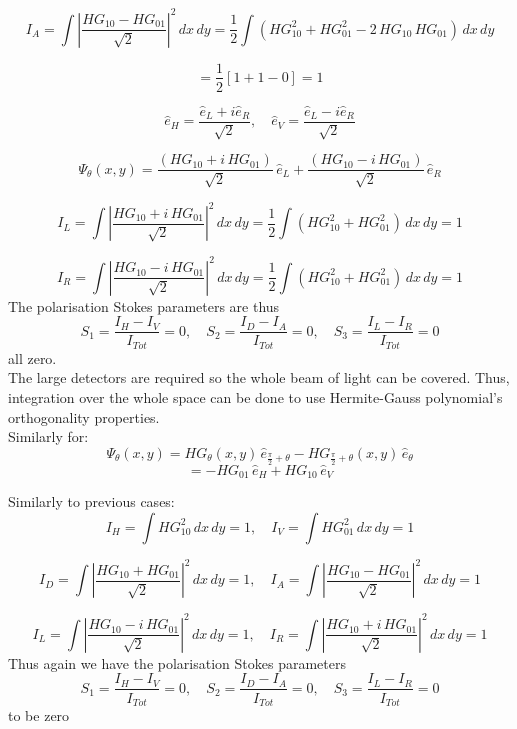 \documentclass{article}
\begin{document}
\[
I_A = \int \left| \frac{HG_{10} - HG_{01}}{\sqrt{2}} \right|^2 \, dx \, dy 
= \frac{1}{2} \int \left( HG_{10}^2 + HG_{01}^2 - 2 \, HG_{10} \, HG_{01} \right) \, dx \, dy
\]

\[
= \frac{1}{2} \left[ 1 + 1 - 0 \right] = 1
\]

\[
\hat{e}_H = \frac{\hat{e}_L + i \hat{e}_R}{\sqrt{2}}, \quad 
\hat{e}_V = \frac{\hat{e}_L - i \hat{e}_R}{\sqrt{2}}
\]

\[
\Psi_{\theta}(x, y) = \frac{(HG_{10} + i \, HG_{01})}{\sqrt{2}} \, \hat{e}_L 
+ \frac{(HG_{10} - i \, HG_{01})}{\sqrt{2}} \, \hat{e}_R
\]

\[
I_L = \int \left| \frac{HG_{10} + i \, HG_{01}}{\sqrt{2}} \right|^2 \, dx \, dy 
= \frac{1}{2} \int \left( HG_{10}^2 + HG_{01}^2 \right) \, dx \, dy = 1
\]

\[
I_R = \int \left| \frac{HG_{10} - i \, HG_{01}}{\sqrt{2}} \right|^2 \, dx \, dy 
= \frac{1}{2} \int \left( HG_{10}^2 + HG_{01}^2 \right) \, dx \, dy = 1
\]
The polarisation Stokes parameters are thus
\[
S_1 = \frac{I_H - I_V}{I_{Tot}} = 0, \quad 
S_2 = \frac{I_D - I_A}{I_{Tot}} = 0, \quad 
S_3 = \frac{I_L - I_R}{I_{Tot}} = 0
\]
all zero.\\


The large detectors are required so the whole beam of light can be covered.  
Thus, integration over the whole space can be done to use Hermite-Gauss polynomial’s orthogonality properties.\\



Similarly for:
\[
\Psi_{\theta}(x, y) = HG_{\theta}(x, y) \, \hat{e}_{\frac{\pi}{2}+\theta} - HG_{\frac{\pi}{2}+\theta}(x, y) \, \hat{e}_{\theta} 
\]
\[
= -HG_{01} \, \hat{e}_H + HG_{10} \, \hat{e}_V
\]

Similarly to previous cases:
\[
I_H = \int HG_{10}^2 \, dx \, dy = 1, \quad 
I_V = \int HG_{01}^2 \, dx \, dy = 1
\]

\[
I_D = \int \left| \frac{HG_{10} + HG_{01}}{\sqrt{2}} \right|^2 \, dx \, dy = 1, \quad 
I_A = \int \left| \frac{HG_{10} - HG_{01}}{\sqrt{2}} \right|^2 \, dx \, dy = 1
\]

\[
I_L = \int \left| \frac{HG_{10} - i \, HG_{01}}{\sqrt{2}} \right|^2 \, dx \, dy = 1, \quad 
I_R = \int \left| \frac{HG_{10} + i \, HG_{01}}{\sqrt{2}} \right|^2 \, dx \, dy = 1
\]
Thus again we have the polarisation Stokes parameters
\[
S_1 = \frac{I_H - I_V}{I_{Tot}} = 0, \quad 
S_2 = \frac{I_D - I_A}{I_{Tot}} = 0, \quad 
S_3 = \frac{I_L - I_R}{I_{Tot}} = 0
\]
to be zero
\end{document}
